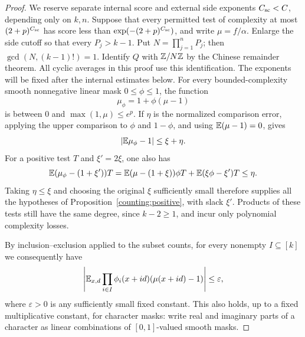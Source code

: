 \begin{proof}
We reserve separate internal score and external side exponents
$C_{\rm sc}<C$, depending only on $k,n$.  Suppose that every permitted
test of complexity at most $(2+p)^{C_{\rm sc}}$ has score less than
$\exp(-(2+p)^{C_{\rm sc}})$, and write $\mu=f/\alpha$.
Enlarge the side cutoff so that every $P_j>k-1$. Put
$N=\prod_{j=1}^nP_j$; then $\gcd(N,(k-1)!)=1$. Identify
$Q$ with $\mathbb Z/N\mathbb Z$ by the Chinese remainder theorem. All cyclic
averages in this proof use this identification.
The exponents will be fixed after the internal estimates below.
For every bounded-complexity smooth
nonnegative linear mask $0\leq\phi\leq1$, the function
\[
 \mu_\phi=1+\phi(\mu-1)
\]
is between $0$ and $\max(1,\mu)\leq e^p$.  If $\eta$ is the
normalized comparison error, applying the upper comparison to
$\phi$ and $1-\phi$, and using $\mathbb E(\mu-1)=0$, gives
\[
 |\mathbb E\mu_\phi-1|\leq\xi+\eta.
\]
For a positive test $T$ and $\xi'=2\xi$, one also has
\[
 \mathbb E(\mu_\phi-(1+\xi'))T
 =\mathbb E(\mu-(1+\xi))\phi T+\mathbb E(\xi\phi-\xi')T
 \leq\eta.
\]
Taking $\eta\leq\xi$ and choosing the original $\xi$ sufficiently
small therefore supplies all the hypotheses of
Proposition~\ref{counting:positive}, with slack $\xi'$.
Products of these tests still have the same degree, since $k-2\geq1$, and incur
only polynomial complexity losses.

By inclusion--exclusion applied to the subset counts, for every nonempty
$I\subseteq[k]$ we consequently have
\begin{equation}\label{counting:centered}
 \left|\mathbb E_{x,d}\prod_{i\in I}
 \phi_i(x+id)(\mu(x+id)-1)\right|\leq\varepsilon,
\end{equation}
where $\varepsilon>0$ is any sufficiently small fixed constant.  This
also holds, up to a fixed multiplicative constant, for character masks:
write real and imaginary parts of a character as linear combinations
of $[0,1]$-valued smooth masks.


\end{proof}
